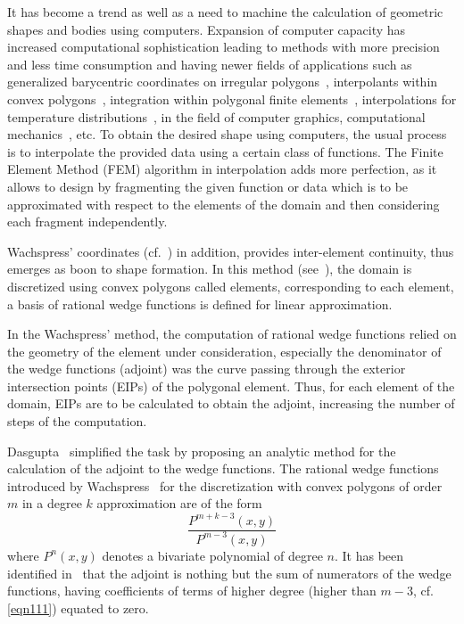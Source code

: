 \documentclass[automatic-bibliography]{univsciauth}
\begin{document}
It has become a trend as well as a need to machine the calculation of geometric
shapes and bodies using computers. Expansion of computer capacity has increased
computational sophistication leading to methods with more precision and less
time consumption and having newer fields of applications such as generalized
barycentric coordinates on irregular polygons~\cite{7}, interpolants within
convex polygons~\cite{das}, integration within polygonal finite
elements~\cite{9}, interpolations for temperature distributions~\cite{10}, in
the field of computer graphics, computational mechanics~\cite{11}, etc. To
obtain the desired shape using computers, the usual process is to interpolate
the provided data using a certain class of functions. The Finite Element Method
(FEM) algorithm in interpolation adds more perfection, as it allows to design by
fragmenting the given function or data which is to be approximated with respect
to the elements of the domain and then considering each fragment independently.

Wachspress' coordinates (cf.~\cite{wach}) in addition, provides inter-element
continuity, thus emerges as boon to shape formation. In this method
(see~\cite{wachs}), the domain is discretized using convex polygons called
elements, corresponding to each element, a basis of rational wedge functions is
defined for linear approximation.

In the Wachspress\rq{} method, the computation of rational wedge functions
relied on the geometry of the element under consideration, especially the
denominator of the wedge functions (adjoint) was the curve passing through the
exterior intersection points (EIPs) of the polygonal element. Thus, for each
element of the domain, EIPs are to be calculated to obtain the adjoint,
increasing the number of steps of the computation.

Dasgupta~\cite{das} simplified the task by proposing an analytic method for the
calculation of the adjoint to the wedge functions. The rational wedge functions
introduced by Wachspress~\cite{wachs} for the discretization with convex
polygons of order $m$ in a degree $k$ approximation are of the form
\begin{equation}
  \frac{P^{m+k-3}(x,y)}{P^{m-3}(x,y)} \label{eqn111}
\end{equation}
where $P^n(x,y)$ denotes a bivariate polynomial of degree  $n$. It has been
identified in~\cite{das} that the adjoint is nothing but the sum of numerators
of the wedge functions, having coefficients of terms of higher degree (higher
than $m-3$, cf. \autoref{eqn111}) equated to zero.
\end{document}
